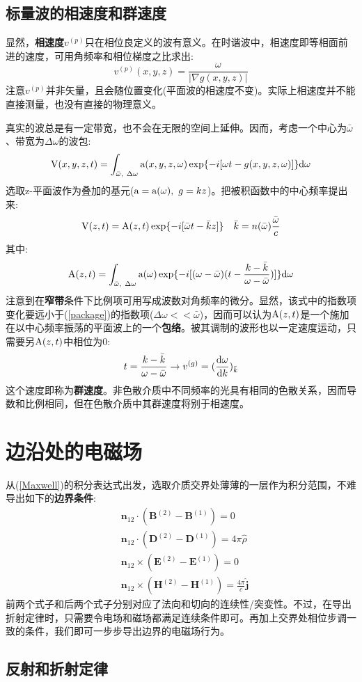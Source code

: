 \documentclass[12pt]{ctexart}%
\begin{document}
\subsection*{标量波的相速度和群速度}
显然，\textbf{相速度}$v^{(p)}$只在相位良定义的波有意义。在时谐波中，相速度即等相面前进的速度，可用角频率和相位梯度之比求出:
\begin{equation}
    v^{(p)}(x,y,z) = \frac{\omega}{|\nabla g(x,y,z)|}
\end{equation}
注意$v^{(p)}$并非矢量，且会随位置变化(平面波的相速度不变)。实际上相速度并不能直接测量，也没有直接的物理意义。
\par 真实的波总是有一定带宽，也不会在无限的空间上延伸。因而，考虑一个中心为$\bar{\omega}$、带宽为$\Delta \omega$的波包:
\begin{equation}
    \textup{V}(x,y,z,t)=\int_{\bar{\omega}, \ \Delta \omega} \textup{a}(x,y,z,\omega)\exp \{-i[\omega t -g(x,y,z,\omega)]\}\textup{d}\omega
\end{equation}
选取z-平面波作为叠加的基元($\textup{a}=\textup{a}(\omega), \ g=kz$)。把被积函数中的中心频率提出来:
\begin{equation}
    \textup{V}(z,t)=\textup{A}(z,t)\exp \{-i[\bar{\omega} t -\bar{k}z]\} \ \ \ \bar{k} = n(\bar{\omega})\frac{\bar{\omega}}{c}
    \label{package}
\end{equation}
其中:
\begin{equation}
    \textup{A}(z,t)=\int_{\bar{\omega}, \ \Delta \omega} \textup{a}(\omega)\exp\{-i[(\omega-\bar{\omega})(t - \frac{k-\bar{k}}{\omega-\bar{\omega}})]\}   \textup{d}\omega
\end{equation}
注意到在\textbf{窄带}条件下比例项可用写成波数对角频率的微分。显然，该式中的指数项变化要远小于(\ref{package})的指数项($\Delta\omega<<\bar{\omega}$)，因而可以认为$\textup{A}(z,t)$是一个施加在以中心频率振荡的平面波上的一个\textbf{包络}。被其调制的波形也以一定速度运动，只需要另$\textup{A}(z,t)$中相位为0:
\begin{equation}
    t = \frac{k-\bar{k}}{\omega-\bar{\omega}} \to v^{(g)} = (\frac{\textup{d}\omega}{\textup{d}k})_{\bar{k}}
\end{equation}
这个速度即称为\textbf{群速度}。非色散介质中不同频率的光具有相同的色散关系，因而导数和比例相同，但在色散介质中其群速度将别于相速度。

\section*{边沿处的电磁场}
从(\ref{Maxwell})的积分表达式出发，选取介质交界处薄薄的一层作为积分范围，不难导出如下的\textbf{边界条件}:
\begin{align}
    &\textbf{n}_{12}\cdot(\textbf{B}^{(2)}-\textbf{B}^{(1)})=0 \\
    &\textbf{n}_{12}\cdot(\textbf{D}^{(2)}-\textbf{D}^{(1)})=4\pi\hat{\rho} \\
    &\textbf{n}_{12}\times(\textbf{E}^{(2)}-\textbf{E}^{(1)})=0 \\
    &\textbf{n}_{12}\times(\textbf{H}^{(2)}-\textbf{H}^{(1)})=\frac{4\pi}{c}\hat{\textbf{j}}
\end{align}
前两个式子和后两个式子分别对应了法向和切向的连续性/突变性。不过，在导出折射定律时，只需要令电场和磁场都满足连续条件即可。再加上交界处相位步调一致的条件，我们即可一步步导出边界的电磁场行为。
\subsection*{反射和折射定律}
\end{document}
